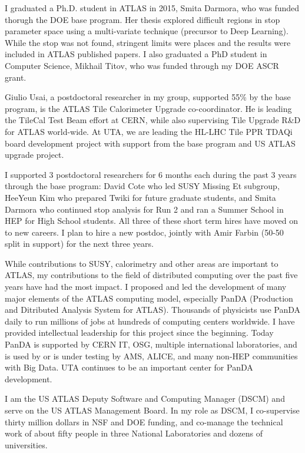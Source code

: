 I graduated a Ph.D. student in ATLAS in 2015, Smita Darmora, who was funded thorugh the DOE base program. Her thesis explored difficult regions in stop parameter space using a multi-variate technique (precursor to Deep Learning). While the stop was not found, stringent limits were places and the results were included in ATLAS published papers. I also graduated a PhD student in Computer Science, Mikhail Titov, who was funded through my DOE ASCR grant.

Giulio Usai, a postdoctoral researcher in my group, supported 55\% by the base program, is the ATLAS Tile Calorimeter Upgrade co-coordinator. He is leading the TileCal Test Beam effort at CERN, while also supervising Tile Upgrade R\&D for ATLAS world-wide. At UTA, we are leading the HL-LHC Tile PPR TDAQi board development project with support from the base program and US ATLAS upgrade project.

I supported 3 postdoctoral researchers for 6 months each during the past 3 years through the base program: David Cote who led SUSY Missing Et subgroup, HeeYeun Kim who prepared Twiki for future graduate students, and Smita Darmora who continued stop analysis for Run 2 and ran a Summer School in HEP for High School students. All three of these short term hires have moved on to new careers. I plan to hire a new postdoc, jointly with Amir Farbin (50-50 split in support) for the next three years.

While contributions to SUSY, calorimetry and other areas are important to ATLAS, my contributions to the field of distributed computing over the past five years have had the most impact. I proposed and led the development of many major elements of the ATLAS computing model, especially PanDA (Production and Ditributed Analysis System for ATLAS). Thousands of physicists use PanDA daily to run millions of jobs at hundreds of computing centers worldwide. I have provided intellectual leadership for this project since the beginning. Today PanDA is supported by CERN IT, OSG, multiple international laboratories, and is used by or is under testing by AMS, ALICE, and many non-HEP communities with Big Data. UTA continues to be an important center for PanDA development.

I am the US ATLAS Deputy Software and Computing Manager (DSCM) and serve on the US ATLAS Management Board. In my role as DSCM, I co-supervise thirty million dollars in NSF and DOE funding, and co-manage the technical work of about fifty people in three National Laboratories and dozens of universities.

